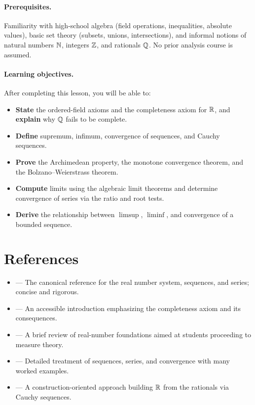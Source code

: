 \documentclass[11pt,a4paper]{article}
\begin{document}
\paragraph{Prerequisites.}
Familiarity with high-school algebra (field operations, inequalities,
absolute values), basic set theory (subsets, unions, intersections), and
informal notions of natural numbers $\mathbb{N}$, integers $\mathbb{Z}$, and rationals $\mathbb{Q}$.
No prior analysis course is assumed.

\paragraph{Learning objectives.}
After completing this lesson, you will be able to:
\begin{itemize}[nosep]
  \item \textbf{State} the ordered-field axioms and the completeness axiom
    for $\mathbb{R}$, and \textbf{explain} why $\mathbb{Q}$ fails to be complete.
  \item \textbf{Define} supremum, infimum, convergence of sequences, and
    Cauchy sequences.
  \item \textbf{Prove} the Archimedean property, the monotone convergence
    theorem, and the Bolzano--Weierstrass theorem.
  \item \textbf{Compute} limits using the algebraic limit theorems and
    determine convergence of series via the ratio and root tests.
  \item \textbf{Derive} the relationship between $\limsup$, $\liminf$,
    and convergence of a bounded sequence.
\end{itemize}

\section{References}
\label{sec:references}

\begin{itemize}
  \item \citet[Chapters 1--3]{rudin1976} --- The canonical reference for
    the real number system, sequences, and series; concise and rigorous.
  \item \citet[Chapters 1--2]{abbott2015} --- An accessible introduction
    emphasizing the completeness axiom and its consequences.
  \item \citet[Chapter 0]{folland1999} --- A brief review of real-number
    foundations aimed at students proceeding to measure theory.
  \item \citet[Chapters 2--3]{bartle2011} --- Detailed treatment of
    sequences, series, and convergence with many worked examples.
  \item \citet[Chapter 1]{tao2016} --- A construction-oriented approach
    building $\mathbb{R}$ from the rationals via Cauchy sequences.
\end{itemize}
\end{document}
